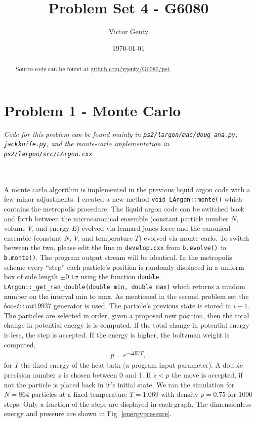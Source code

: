 \documentclass[singlepage,notitlepage,nofootinbib,11pt]{revtex4-1}
\newcommand{\eq}[1]{\begin{align*}#1\end{align*}}
\begin{document}
\title{Problem Set 4 - G6080}
\author{Victor Genty}
\date{\today}
\begin{abstract}
\centering
Source code can be found at \href{https://github.com/vgenty/G6080/tree/master/ps4}{github.com/vgenty/G6080/ps4}
\end{abstract}
\maketitle
\section{Problem 1 - Monte Carlo}
\begin{center}{\it Code for this problem can be found mainly in \verb|ps2/largon/mac/doug_ana.py|, \verb|jackknife.py|, and the monte-carlo implementation in \verb|ps2/largon/src/LArgon.cxx|}\end{center}\\\hspace{1pt}\\
\indent A monte carlo algorithm is implemented in the previous liquid argon code with a few minor adjustments. I created a new method \verb|void LArgon::monte()| which contains the metropolis procedure. The liquid argon code can be switched back and forth between the microcanonical ensemble (constant particle number $N$, volume $V$, and energy $E$) evolved via lennard jones force and the canonical ensemble (constant $N$, $V$, and temperature $T$) evolved via monte carlo. To switch between the two, please edit the line in \verb|develop.cxx| from \verb|b.evolve()| to \verb|b.monte()|. The program output stream will be identical. In the metropolis scheme every ``step'' each particle's position is randomly displaced in a uniform box of side length $\pm 0.1\sigma$ using the function \verb|double LArgon::_get_ran_double(double min, double max)| which returns a random number on the interval min to max. As mentioned in the second problem set the $boost::mt19937$ generator is used. The particle's previous state is stored in $i-1$. The particles are selected in order, given a proposed new position, then the total change in potential energy is is computed. If the total change in potential energy is less, the step is accepted. If the energy is higher, the boltzman weight is computed,
\eq{
  p = e^{-\Delta E/T},
}
for $T$ the fixed energy of the heat bath (a program input parameter). A double precision number $z$ is chosen between 0 and 1. If $z < p$ the move is accepted, if not the particle is placed back in it's initial state. We ran the simulation for $N=864$ particles at a fixed temperature $T=1.069$ with density $\rho=0.75$ for 1000 steps. Only a fraction of the steps are displayed in each graph. The dimensionless energy and pressure are shown in Fig. \ref{energypressure}.
\end{document}
